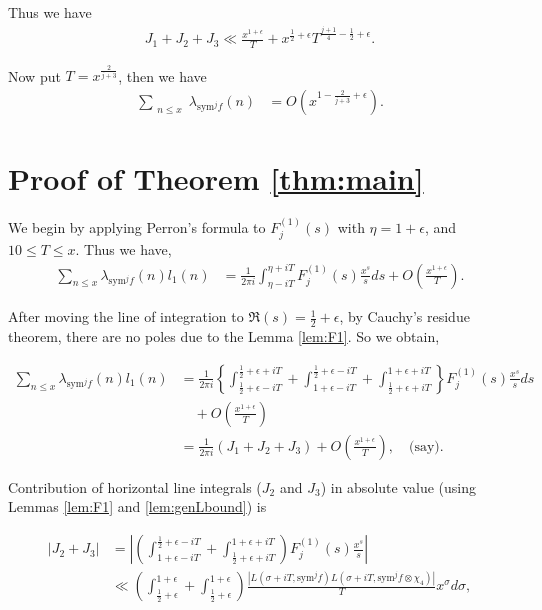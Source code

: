\documentclass[10pt]{amsart}
\begin{document}
Thus we have \begin{align}
    J_1+J_2+J_3 \ll \frac{x^{1+\epsilon}}{T}+x^{\frac{1}{2}+\epsilon} T^{\frac{j+1}{4}-\frac{1}{2}+\epsilon}.
\end{align}

Now put $T = x^{\frac{2}{j+3}}$, then we have \begin{align}
    \sum_{\substack{n\leq x}}\lambda_{\mathrm{sym}^jf}(n) &= O\left( x^{1-\frac{2}{j+3}+\epsilon} \right).
\end{align}

\section{Proof of Theorem \ref{thm:main}} \label{sec:main}

We begin by applying Perron's formula to $F_{j}^{(1)}(s)$ with $\eta=1+\epsilon$, and $10\leq T\leq x$. Thus we have,
\begin{align*}
\sum_{n\leq x}\lambda_{\mathrm{sym}^{j}f}(n)l_1(n)
&= \frac{1}{2\pi i}\int_{\eta-iT}^{\eta+iT}F_{j}^{(1)}(s)\frac{x^{s}}{s}ds + O\left(\frac{x^{1+\epsilon}}{T}\right).
\end{align*}

After moving the line of integration to $\Re(s)=\frac{1}{2}+\epsilon$, by Cauchy's residue theorem, there are no poles due to the Lemma \ref{lem:F1}.
So we obtain,

\begin{align} \label{eq:LambdaEq}
    \sum_{n\leq x}\lambda_{\mathrm{sym}^{j}f}(n)l_1(n) &= \frac{1}{2\pi i}\left\{\int_{\frac{1}{2}+\epsilon-iT}^{\frac{1}{2}+\epsilon+iT}+\int_{1+\epsilon-iT}^{\frac{1}{2}+\epsilon-iT}+\int_{\frac{1}{2}+\epsilon+iT}^{1+\epsilon+iT}\right\}F_{j}^{(1)}(s)\frac{x^{s}}{s}ds \\
    &\quad + O\left(\frac{x^{1+\epsilon}}{T}\right) \\
    &= \frac{1}{2\pi i}(J_{1}+J_{2}+J_{3})+O\left(\frac{x^{1+\epsilon}}{T}\right), \quad \text{(say)}.
\end{align}

Contribution of horizontal line integrals ($J_{2}$ and $J_{3}$) in absolute value (using Lemmas \ref{lem:F1} and \ref{lem:genLbound}) is

\begin{align}
    |J_2+J_3| &= \left| \left( \int_{1+\epsilon-iT}^{\frac{1}{2}+\epsilon-iT}+\int_{\frac{1}{2}+\epsilon+iT}^{1+\epsilon+iT} \right)F_j^{(1)}(s)\frac{x^s}{s}\right| \\
    &\ll  \left( \int_{\frac{1}{2}+\epsilon}^{1+\epsilon} + \int_{\frac{1}{2}+\epsilon}^{1+\epsilon}\right) \frac{|L(\sigma+iT, \mathrm{sym}^j f ) L(\sigma+iT, \mathrm{sym}^j f \otimes \chi_4)|}{T}x^\sigma d\sigma ,
\end{align}
\end{document}
